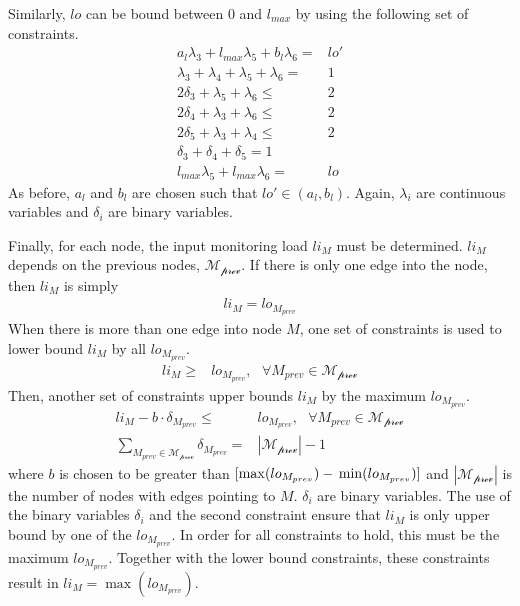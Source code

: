 Similarly, $lo$ can be bound between $0$ and $l_{max}$ by using the following
set of constraints.
\begin{align*}
  a_l\lambda_3 + l_{max}\lambda_5 + b_l\lambda_6 =& lo'\\
  \lambda_3 + \lambda_4 + \lambda_5 + \lambda_6 =& 1 \\
  2 \delta_3 + \lambda_5 + \lambda_6 \leq& 2 \\
  2 \delta_4 + \lambda_3 + \lambda_6 \leq& 2 \\
  2 \delta_5 + \lambda_3 + \lambda_4 \leq& 2 \\
  \delta_3 + \delta_4 + \delta_5 = 1 \\
  l_{max}\lambda_5 + l_{max}\lambda_6 =& lo
\end{align*}
As before, $a_l$ and $b_l$ are chosen such that $lo' \in (a_l, b_l)$.  Again,
$\lambda_i$ are continuous variables and $\delta_i$  are binary variables.

Finally, for each node, the input monitoring load $li_{M}$ must be determined.
$li_{M}$ depends on the previous nodes, $\mathcal{M_\text{prev}}$. If there is
only one edge into the node, then $li_M$ is simply
\begin{align*}
  li_{M} = lo_{M_{prev}}
\end{align*}
When there is more than one edge into node $M$, one set of constraints is used
to lower bound $li_{M}$ by all $lo_{M_{prev}}$.
\begin{align*}
  li_{M} \geq& lo_{M_{prev}}, \text{ } \forall M_{prev} \in \mathcal{M_\text{prev}}
\end{align*}
Then, another set of constraints upper bounds $li_{M}$ by the maximum $lo_{M_{prev}}$.
\begin{align*}
  li_{M} - b \cdot \delta_{M_{prev}} \leq& lo_{M_{prev}}, \text{ } \forall M_{prev} \in \mathcal{M_\text{prev}} \\
  \sum_{M_{prev} \in \mathcal{M_\text{prev}}}\delta_{M_{prev}} =& |\mathcal{M_\text{prev}}| - 1
\end{align*}
where $b$ is chosen to be greater than $[\max(lo_{M_{prev}}) -\\
\min(lo_{M_{prev}})]$ and $|\mathcal{M_\text{prev}}|$ is the number of nodes
with edges pointing to $M$. $\delta_i$ are binary variables. The use of the
binary variables $\delta_i$ and the second constraint ensure that $li_{M}$ is
only upper bound by one of the $lo_{M_{prev}}$. In order for all constraints to
hold, this must be the maximum $lo_{M_{prev}}$. Together with the lower bound
constraints, these constraints result in $li_{M} = \max(lo_{M_{prev}})$. 

